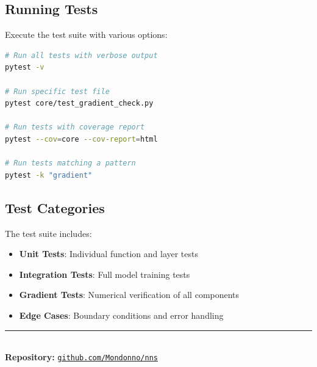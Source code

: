 \documentclass[12pt,a4paper]{article}
\begin{document}
\subsection{Running Tests}

Execute the test suite with various options:

\begin{lstlisting}[language=bash, numbers=none]
# Run all tests with verbose output
pytest -v

# Run specific test file
pytest core/test_gradient_check.py

# Run tests with coverage report
pytest --cov=core --cov-report=html

# Run tests matching a pattern
pytest -k "gradient"
\end{lstlisting}

\subsection{Test Categories}

The test suite includes:
\begin{itemize}
    \item \textbf{Unit Tests}: Individual function and layer tests
    \item \textbf{Integration Tests}: Full model training tests
    \item \textbf{Gradient Tests}: Numerical verification of all components
    \item \textbf{Edge Cases}: Boundary conditions and error handling
\end{itemize}


\vspace{1cm}
\begin{center}
\rule{0.9\textwidth}{0.4pt}\\[0.3cm]
\textbf{Repository:} \href{https://github.com/Mondonno/nns}{\texttt{github.com/Mondonno/nns}}
\end{center}
\end{document}
